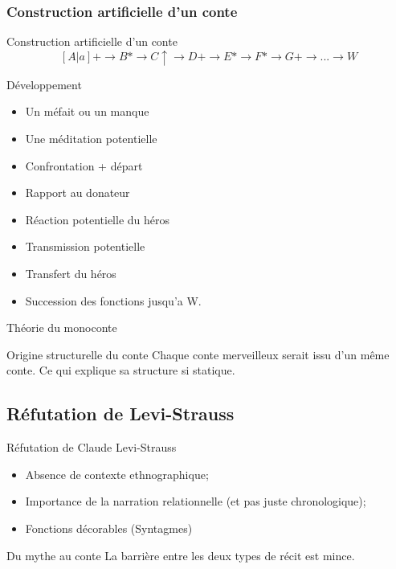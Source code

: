 \documentclass{beamer}
\begin{document}
\subsubsection{Construction artificielle d'un conte}
\begin{frame}{Construction artificielle d'un conte}
  $$ [A|a]+ \rightarrow B* \rightarrow C\uparrow \rightarrow D+ \rightarrow E*  \rightarrow F*  \rightarrow G+  \rightarrow ... \rightarrow W $$
  \scriptsize
  \begin{block}{Développement}
    \begin{itemize}
      \item Un méfait ou un manque 
      \item Une méditation potentielle
      \item Confrontation + départ 
      \item Rapport au donateur
      \item Réaction potentielle du héros
      \item Transmission potentielle
      \item Transfert du héros
      \item Succession des fonctions jusqu'a W.
        
    \end{itemize}
    \normalsize
  \end{block}
\end{frame}

\begin{frame}{Théorie du monoconte}
  \begin{block}{Origine structurelle du conte}
    Chaque conte merveilleux serait issu d'un même conte. Ce qui explique sa structure si statique.
  \end{block}
\end{frame}


\subsection{Réfutation de Levi-Strauss}
\begin{frame}{Réfutation de Claude Levi-Strauss}
  \begin{itemize}
    \item Absence de contexte ethnographique;
    \item Importance de la narration relationnelle (et pas juste chronologique);
    \item Fonctions décorables (Syntagmes)
  \end{itemize}
  \begin{block}{Du mythe au conte}
    La barrière entre les deux types de récit est mince.
  \end{block}
\end{frame}
\end{document}
